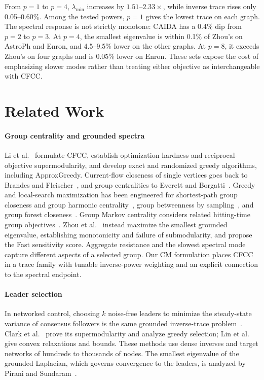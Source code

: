 From $p=1$ to $p=4$, $\lambda_{\min}$ increases by
$1.51$--$2.33\times$, while inverse trace rises only 0.05--0.60\%.
Among the tested powers, $p=1$ gives the lowest trace on each graph.
The spectral response is not strictly monotone: CAIDA has a 0.4\%
dip from $p=2$ to $p=3$. At $p=4$, the smallest eigenvalue is
within 0.1\% of Zhou's on AstroPh and Enron, and 4.5--9.5\%
lower on the other graphs. At $p=8$, it exceeds Zhou's on four
graphs and is 0.05\% lower on Enron. These sets expose the cost
of emphasizing slower modes rather than treating either objective
as interchangeable with CFCC.

\section{Related Work}\label{sec:related}
\paragraph{Group centrality and grounded spectra}
Li et al.~\cite{li2019} formulate CFCC, establish optimization
hardness and reciprocal-objective supermodularity, and develop exact
and randomized greedy algorithms, including ApproxGreedy.
Current-flow closeness of single vertices goes back to Brandes and
Fleischer~\cite{brandes2005}, and group centralities to Everett and
Borgatti~\cite{everett1999}. Greedy and local-search maximization has
been engineered for shortest-path group closeness and group
harmonic centrality~\cite{bergamini2018,angriman2021}, group
betweenness by sampling~\cite{mahmoody2016}, and group forest
closeness~\cite{grinten2021}. Group Markov centrality considers
related hitting-time group objectives~\cite{wang2026}. Zhou et al.~\cite{zhou2023} instead
maximize the smallest grounded eigenvalue, establishing monotonicity
and failure of submodularity, and propose the Fast sensitivity score.
Aggregate resistance and the slowest spectral mode capture different
aspects of a selected group. Our CM formulation places CFCC in a
trace family with tunable inverse-power weighting and an explicit
connection to the spectral endpoint.

\paragraph{Leader selection}
In networked control, choosing $k$ noise-free leaders to minimize the
steady-state variance of consensus followers is the same grounded
inverse-trace problem~\cite{patterson2010}. Clark et
al.~\cite{clark2014} prove its supermodularity and analyze greedy
selection; Lin et al.~\cite{lin2014} give convex relaxations and
bounds. These methods use dense inverses and target networks of
hundreds to thousands of nodes. The smallest eigenvalue of the
grounded Laplacian, which governs convergence to the leaders, is
analyzed by Pirani and Sundaram~\cite{pirani2016}.

